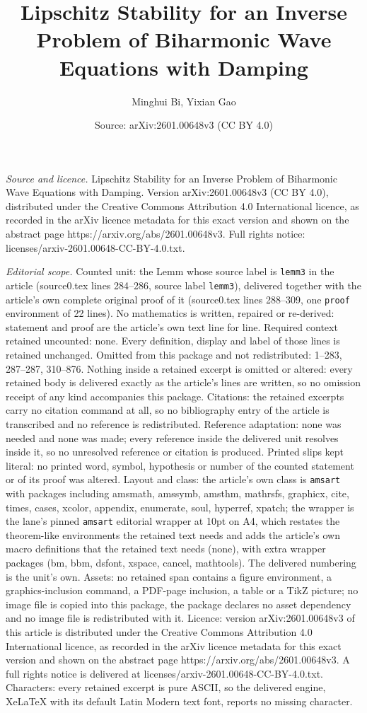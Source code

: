 \documentclass[10pt,a4paper]{amsart}
\title[Lipschitz Stability for an Inverse Problem of Biharmonic Wav]{Lipschitz Stability for an Inverse Problem of Biharmonic Wave Equations with Damping}
\author{Minghui Bi, Yixian Gao}
\date{Source: arXiv:2601.00648v3 (CC BY 4.0)}
\begin{document}
\maketitle

\noindent\emph{Source and licence.} Lipschitz Stability for an Inverse Problem of Biharmonic Wave Equations with Damping. Version arXiv:2601.00648v3 (CC BY 4.0), distributed under the Creative Commons Attribution 4.0 International licence, as recorded in the arXiv licence metadata for this exact version and shown on the abstract page https://arxiv.org/abs/2601.00648v3. Full rights notice: licenses/arxiv-2601.00648-CC-BY-4.0.txt.\par\smallskip

\noindent\textit{Editorial scope.} Counted unit: the Lemm whose source label is \texttt{lemm3} in the article (source0.tex lines 284--286, source label \texttt{lemm3}), delivered together with the article's own complete original proof of it (source0.tex lines 288--309, one \texttt{proof} environment of 22 lines). No mathematics is written, repaired or re-derived: statement and proof are the article's own text line for line. Required context retained uncounted: none. Every definition, display and label of those lines is retained unchanged. Omitted from this package and not redistributed: 1--283, 287--287, 310--876. Nothing inside a retained excerpt is omitted or altered: every retained body is delivered exactly as the article's lines are written, so no omission receipt of any kind accompanies this package. Citations: the retained excerpts carry no citation command at all, so no bibliography entry of the article is transcribed and no reference is redistributed. Reference adaptation: none was needed and none was made; every reference inside the delivered unit resolves inside it, so no unresolved reference or citation is produced. Printed slips kept literal: no printed word, symbol, hypothesis or number of the counted statement or of its proof was altered. Layout and class: the article's own class is \texttt{amsart} with packages including amsmath, amssymb, amsthm, mathrsfs, graphicx, cite, times, cases, xcolor, appendix, enumerate, soul, hyperref, xpatch; the wrapper is the lane's pinned \texttt{amsart} editorial wrapper at 10pt on A4, which restates the theorem-like environments the retained text needs and adds the article's own macro definitions that the retained text needs (none), with extra wrapper packages (bm, bbm, dsfont, xspace, cancel, mathtools). The delivered numbering is the unit's own. Assets: no retained span contains a figure environment, a graphics-inclusion command, a PDF-page inclusion, a table or a TikZ picture; no image file is copied into this package, the package declares no asset dependency and no image file is redistributed with it. Licence: version arXiv:2601.00648v3 of this article is distributed under the Creative Commons Attribution 4.0 International licence, as recorded in the arXiv licence metadata for this exact version and shown on the abstract page https://arxiv.org/abs/2601.00648v3. A full rights notice is delivered at licenses/arxiv-2601.00648-CC-BY-4.0.txt. Characters: every retained excerpt is pure ASCII, so the delivered engine, XeLaTeX with its default Latin Modern text font, reports no missing character.
\end{document}

